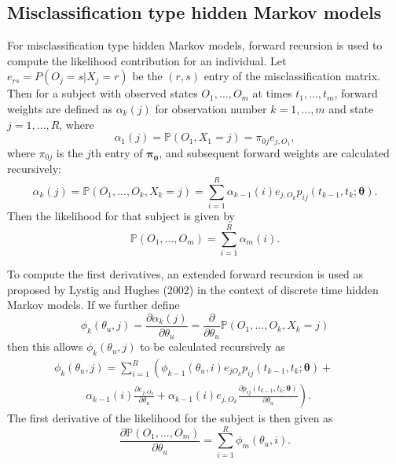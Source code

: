\documentclass{article}
\newcommand{\prob}{\mathbb{P}}
\numberwithin{equation}{section}
\begin{document}
\subsection{Misclassification type hidden Markov models}

For misclassification type hidden Markov models, forward recursion is used to compute the likelihood contribution for an individual. Let $e_{rs} = P(O_j = s | X_j = r)$ be the $(r,s)$ entry of the misclassification matrix. Then for a subject with observed states $O_1,\ldots,O_m$ at times $t_1,\ldots,t_m$, forward weights are defined as $\alpha_{k}(j)$ for observation number $k=1,\ldots,m$ and state $j=1,\ldots,R$, where
\begin{displaymath}\alpha_{1}(j) = \prob(O_{1}, X_{1}=j) = \pi_{0j}e_{j,O_{1}},\end{displaymath}
where $\pi_{0j}$ is the $j$th entry of $\mathbf{\pi_{0}}$, and subsequent forward weights are calculated recursively:
\begin{displaymath}\alpha_{k}(j) = \prob(O_{1},\ldots,O_{k}, X_{k}=j) = \sum_{i=1}^{R} \alpha_{k-1}(i)e_{j,O_{k}}p_{ij}(t_{k-1},t_{k} ; \bm\theta).\end{displaymath}
Then the likelihood for that subject is given by
\begin{displaymath}\prob(O_{1},\ldots,O_{m}) = \sum_{i=1}^{R} \alpha_{m}(i).\end{displaymath}

To compute the first derivatives, an extended forward recursion is used as proposed by Lystig and Hughes (2002) \cite{lystig} in the context of discrete time hidden Markov models. If we further define
\begin{displaymath}\phi_{k}(\theta_{u},j) = \frac{\partial \alpha_{k}(j)}{\partial \theta_{u}} = \frac{\partial}{\partial \theta_{u}} \prob(O_1,\ldots,O_k,X_k = j)\end{displaymath}
then this allows $\phi_{k}(\theta_{u},j)$ to be calculated recursively as
\begin{equation}
\begin{split}
\phi_{k}(\theta_{u},j) = \sum_{i=1}^{R} \left( \phi_{k-1}(\theta_{u},i)e_{jO_{k}}p_{ij}(t_{k-1},t_{k} ; \bm\theta) + \phantom{\frac{~}{~}} ~~~~~~~~ \right. \\ \left. ~~~~~~~~~~~~~ \alpha_{k-1}(i)\frac{\partial e_{j,O_{k}}}{\partial \theta_{u}} + \alpha_{k-1}(i)e_{j,O_{k}}\frac{\partial p_{ij}(t_{k-1},t_{k};\bm\theta)}{\partial \theta_{u}} \right).
\end{split}\end{equation}
The first derivative of the likelihood for the subject is then given as
\begin{displaymath}\frac{\partial \prob(O_1,\ldots,O_{m})}{\partial \theta_u} = \sum_{i=1}^{R} \phi_{m}(\theta_u,i).\end{displaymath}
\end{document}
